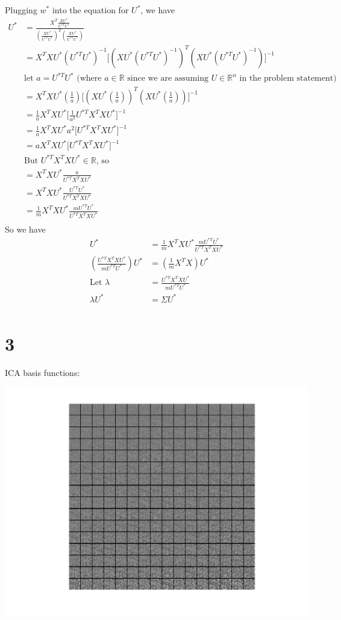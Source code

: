 \documentclass[11pt]{article}
\begin{document}
Plugging $w^*$ into the equation for $U^*$, we have
\begin{align*}
    U^* &= \frac{X^T \frac{XU^*}{U^{*T} U^*}}{(\frac{XU^*}{U^{*T}U^*})^T (\frac{XU^*}{U^{*T}U^*})} \\
        &= X^T X U^* (U^{*T} U^*)^{-1} \big[ (X U^* (U^{*T} U^*)^{-1})^T (X U^* (U^{*T} U^*)^{-1}) \big]^{-1} \\
        &\text{let $a = U^{*T} U^*$ (where $a \in \mathbb{R}$ since we are assuming $U \in \mathbb{R}^n$ in the problem statement)} \\
        &= X^T X U^* (\frac{1}{a}) \big[ (X U^* (\frac{1}{a}))^T (X U^* (\frac{1}{a})) \big]^{-1} \\
        &= \frac{1}{a} X^T X U^* \big[ \frac{1}{a^2} U^{*T} X^T X U^* \big]^{-1} \\
        &= \frac{1}{a} X^T X U^* a^2 \big[ U^{*T} X^T X U^* \big]^{-1} \\
        &= a X^T X U^* \big[ U^{*T} X^T X U^* \big]^{-1} \\
        &\text{But $U^{*T} X^T X U^* \in \mathbb{R}$, so} \\
        &= X^T X U^* \frac{a}{U^{*T} X^T X U^*} \\
        &= X^T X U^* \frac{U^{*T} U^*}{U^{*T} X^T X U^*} \\
        &= \frac{1}{m} X^T X U^* \frac{m U^{*T} U^*}{U^{*T} X^T X U^*} \\
\end{align*}
So we have
\begin{align*}
    U^* &= \frac{1}{m} X^T X U^* \frac{m U^{*T} U^*}{U^{*T} X^T X U^*} \\
    (\frac{U^{*T} X^T X U^*}{m U^{*T} U^*}) U^* &= (\frac{1}{m} X^T X) U^* \\
    \text{Let } \lambda &= \frac{U^{*T} X^T X U^*}{m U^{*T} U^*}\\
    \lambda U^* &= \Sigma U^* \\
\end{align*}

\pagebreak
\section*{3}
ICA basis functions:

\includegraphics[width=\textwidth]{q3/ica_filters.png}
\end{document}
